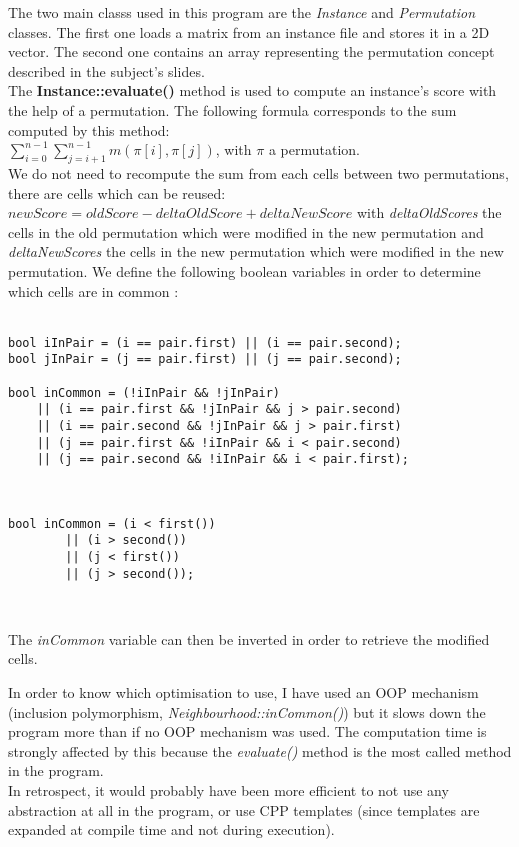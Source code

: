 The two main classs used in this program are the \emph{Instance} and
\emph{Permutation} classes. The first one loads a matrix from an instance file
and stores it in a 2D vector. The second one contains an array representing the
permutation concept described in the subject's slides.\\

The \textbf{Instance::evaluate()} method is used to compute an instance's score
with the help of a permutation. The following formula corresponds to the sum
computed by this method:\\
$\sum_{i=0}^{n-1} \sum_{j=i+1}^{n-1} m(\pi[i], \pi[j])$, with $\pi$ a permutation.\\

We do not need to recompute the sum from each cells between two permutations,
there are cells which can be reused: $newScore = oldScore - deltaOldScore + deltaNewScore$
with \emph{deltaOldScores} the cells in the old permutation which were modified
in the new permutation and \emph{deltaNewScores} the cells in the new permutation
which were modified in the new permutation. We define the following boolean
variables in order to determine which cells are in common :\\\\

\begin{lstlisting}[caption="Cells in common for transpose \& exchange neighbourhoods"]
bool iInPair = (i == pair.first) || (i == pair.second);
bool jInPair = (j == pair.first) || (j == pair.second);

bool inCommon = (!iInPair && !jInPair)
    || (i == pair.first && !jInPair && j > pair.second)
    || (i == pair.second && !jInPair && j > pair.first)
    || (j == pair.first && !iInPair && i < pair.second)
    || (j == pair.second && !iInPair && i < pair.first);
\end{lstlisting}
\

\begin{lstlisting}[caption="Cells in common for insert neighbourhoods"]
    bool inCommon = (i < first())
        || (i > second())
        || (j < first())
        || (j > second());
\end{lstlisting}
\

\noindent The \emph{inCommon} variable can then be inverted in order to retrieve the
modified cells.\\

\begin{frameurgent}
	In order to know which optimisation to use, I have used an OOP mechanism
	(inclusion polymorphism, \emph{Neighbourhood::inCommon()}) but it slows
	down the program more than if no OOP mechanism was used. The computation
	time is strongly affected by this because the \emph{evaluate()} method is
	the most called method in the program.\\
	
	\noindent In retrospect, it would probably have been more efficient to not
	use any abstraction at all in the program, or use CPP templates (since
	templates are expanded at compile time and not during execution).
\end{frameurgent}

